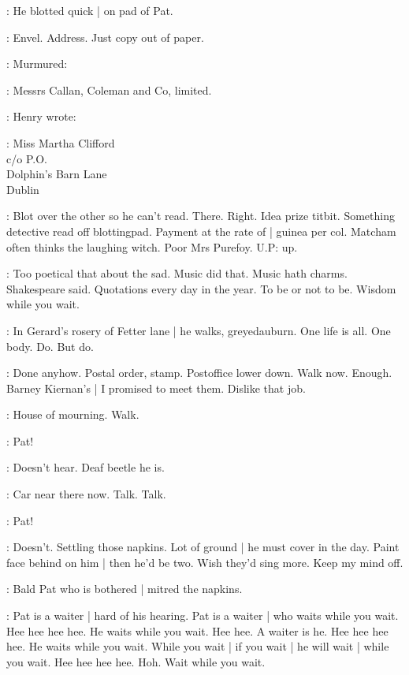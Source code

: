 :
He blotted quick |
on pad of Pat.

\BloomInt:
Envel.
Address.
Just copy out of paper.

:
Murmured:

\BloomInt:
Messrs Callan,
Coleman and Co,
limited.

:
Henry wrote:

:
    Miss Martha Clifford\\
    \-\hspace{3cm}    c/o P.O.\\
    \-\hspace{2cm} Dolphin's Barn Lane\\
    \-\hspace{3cm}    Dublin

\BloomInt:
Blot over the other so he can't read.
There.
Right.
Idea prize titbit.
Something detective read off blottingpad.
Payment at the rate of |
guinea per col.
Matcham often thinks the laughing witch.
Poor Mrs Purefoy.
U.P: up.

\BloomInt:
Too poetical that about the sad.
Music did that.
Music hath charms.
Shakespeare said.
Quotations every day in the year.
To be or not to be.
Wisdom while you wait.

\BloomInt:
In Gerard's rosery of Fetter lane |
he walks,
greyed\-auburn.
One life is all.
One body.
Do.
But do.

\BloomInt:
Done anyhow.
Postal order,
stamp.
Postoffice lower down.
Walk now.
Enough.
Barney Kiernan's |
I promised to meet them.
Dislike that job.

\BloomInt:
House of mourning.
Walk.

\Bloom:
Pat!

\BloomInt:
Doesn't hear.
Deaf beetle he is.

\BloomInt:
Car near there now.
Talk.
Talk.

\Bloom:
Pat!

\BloomInt:
Doesn't.
Settling those napkins.
Lot of ground |
he must cover in the day.
Paint face behind on him |
then he'd be two.
Wish they'd sing more.
Keep my mind off.

:
Bald Pat who is bothered |
mitred the napkins.

\BloomInt:
Pat is a waiter |
hard of his hearing.
Pat is a waiter |
who waits while you wait.
Hee hee hee hee.
He waits while you wait.
Hee hee.
A waiter is he.
Hee hee hee hee.
He waits while you wait.
While you wait |
if you wait |
he will wait |
while you wait.
Hee hee hee hee.
Hoh.
Wait while you wait.

